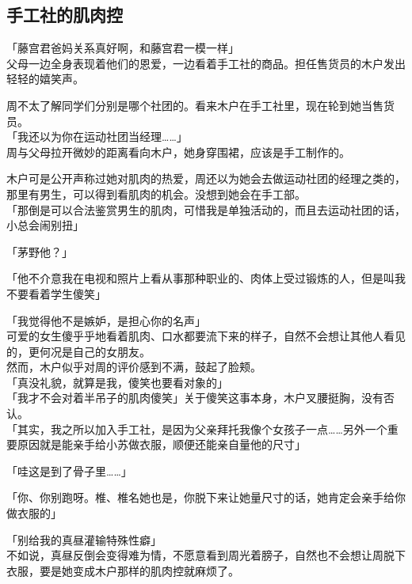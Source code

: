 \subsection{手工社的肌肉控}

「藤宫君爸妈关系真好啊，和藤宫君一模一样」\\

父母一边全身表现着他们的恩爱，一边看着手工社的商品。担任售货员的木户发出轻轻的嬉笑声。

周不太了解同学们分别是哪个社团的。看来木户在手工社里，现在轮到她当售货员。\\

「我还以为你在运动社团当经理……」\\

周与父母拉开微妙的距离看向木户，她身穿围裙，应该是手工制作的。

木户可是公开声称过她对肌肉的热爱，周还以为她会去做运动社团的经理之类的，那里有男生，可以得到看肌肉的机会。没想到她会在手工部。\\

「那倒是可以合法鉴赏男生的肌肉，可惜我是单独活动的，而且去运动社团的话，小总会闹别扭」

「茅野他？」

「他不介意我在电视和照片上看从事那种职业的、肉体上受过锻炼的人，但是叫我不要看着学生傻笑」

「我觉得他不是嫉妒，是担心你的名声」\\

可爱的女生傻乎乎地看着肌肉、口水都要流下来的样子，自然不会想让其他人看见的，更何况是自己的女朋友。\\

然而，木户似乎对周的评价感到不满，鼓起了脸颊。\\

「真没礼貌，就算是我，傻笑也要看对象的」\\

「我才不会对着半吊子的肌肉傻笑」关于傻笑这事本身，木户叉腰挺胸，没有否认。\\

「其实，我之所以加入手工社，是因为父亲拜托我像个女孩子一点……另外一个重要原因就是能亲手给小苏做衣服，顺便还能亲自量他的尺寸」

「哇这是到了骨子里……」

「你、你别跑呀。椎、椎名她也是，你脱下来让她量尺寸的话，她肯定会亲手给你做衣服的」

「别给我的真昼灌输特殊性癖」\\

不如说，真昼反倒会变得难为情，不愿意看到周光着膀子，自然也不会想让周脱下衣服，要是她变成木户那样的肌肉控就麻烦了。\\

